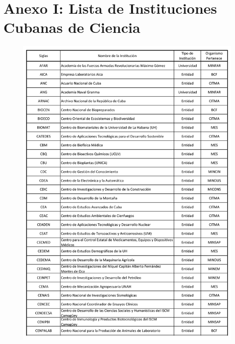 \chapter{Anexo I: Lista de Instituciones Cubanas de Ciencia}\label{ch:anexo-i:-lista-de-instituciones-cubanas-de-ciencia}

\begin{figure}
    \centering
    \includegraphics[width=\linewidth]{Figure/anexo/1}\label{fig:figure1}
\end{figure}

